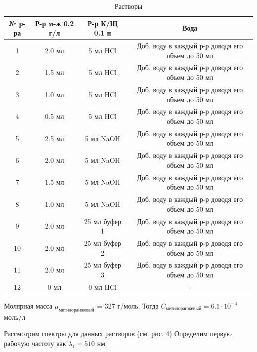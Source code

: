\documentclass[a4paper,12pt]{article}
\begin{document}
\begin{table}[H]
    \begin{center}
        \begin{tabular}{|c|c|c|c|}
        \hline
            № р-ра & Р-р м-ж 0.2 г/л & Р-р К/Щ 0.1 н & Вода\\\hline
            1 & 2.0 мл & 5 мл HCl & Доб. воду в каждый р-р доводя его объем до 50 мл\\\hline
            2 & 1.5 мл & 5 мл HCl & Доб. воду в каждый р-р доводя его объем до 50 мл\\\hline
            3 & 1.0 мл & 5 мл HCl & Доб. воду в каждый р-р доводя его объем до 50 мл\\\hline
            4 & 0.5 мл & 5 мл HCl & Доб. воду в каждый р-р доводя его объем до 50 мл\\\hline
            5 & 2.5 мл & 5 мл NaOH & Доб. воду в каждый р-р доводя его объем до 50 мл\\\hline
            6 & 2.0 мл & 5 мл NaOH & Доб. воду в каждый р-р доводя его объем до 50 мл\\\hline
            7 & 1.5 мл & 5 мл NaOH & Доб. воду в каждый р-р доводя его объем до 50 мл\\\hline
            8 & 1.0 мл & 5 мл NaOH & Доб. воду в каждый р-р доводя его объем до 50 мл\\\hline
            9 & 2.0 мл & 25 мл буфер 1 & Доб. воду в каждый р-р доводя его объем до 50 мл\\\hline
            10 & 2.0 мл & 25 мл буфер 2 & Доб. воду в каждый р-р доводя его объем до 50 мл\\\hline
            11 & 2.0 мл & 25 мл буфер 3 & Доб. воду в каждый р-р доводя его объем до 50 мл\\\hline
            12 & 0 мл & 0 мл HCl & -\\\hline
        \end{tabular}
        \caption{Растворы}
    \end{center}
\end{table}

Молярная масса $\mu_{\text{метилоранжевый}}$ = 327 г/моль. Тогда $C_{\text{метилоранжевый}} = 6.1 \cdot 10^{-4}$ моль/л 

Рассмотрим спектры для данных растворов (см. рис. 4) Определим первую рабочую частоту как $\lambda_1 = 510$ нм
\end{document}
